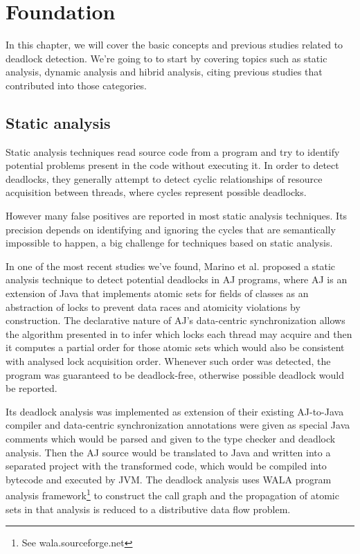 \chapter{Foundation}

In this chapter, we will cover the basic concepts and previous studies related to deadlock detection. We're going to to start by covering topics such as static analysis, dynamic analysis and hibrid analysis, citing previous studies that contributed into those categories.

\section{Static analysis}

Static analysis techniques read source code from a program and try to identify potential problems present in the code without executing it.
In order to detect deadlocks, they generally attempt to detect cyclic relationships of resource acquisition between threads, where cycles represent possible deadlocks.

However many false positives are reported in most static analysis techniques.
Its precision depends on identifying and ignoring the cycles that are semantically impossible to happen, a big challenge for techniques based on static analysis.

In one of the most recent studies we've found, Marino et al. \cite{marino} proposed a static analysis technique to detect potential deadlocks in AJ programs,
where AJ is an extension of Java that implements atomic sets for fields of classes as an abstraction of locks
to prevent data races and atomicity violations by construction.
The declarative nature of AJ's data-centric synchronization allows the algorithm presented in \cite{marino} to infer which locks each thread may acquire and
then it computes a partial order for those atomic sets which would also be consistent with analysed lock acquisition order.
Whenever such order was detected, the program was guaranteed to be deadlock-free, otherwise possible deadlock would be reported.

Its deadlock analysis was implemented as extension of their existing AJ-to-Java compiler and data-centric synchronization annotations were given as special Java comments which
would be parsed and given to the type checker and deadlock analysis. Then the AJ source would be translated to Java and written into a separated project with the transformed code,
which would be compiled into bytecode and executed by JVM. The deadlock analysis uses WALA program analysis framework\footnote{See wala.sourceforge.net} to construct the call graph and the propagation of atomic sets in that analysis is reduced to a distributive data flow problem.

